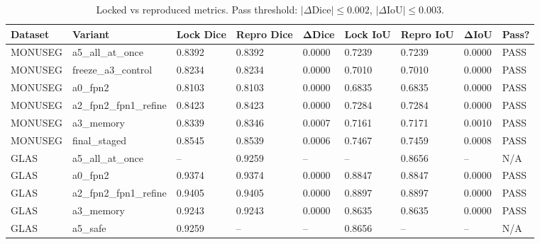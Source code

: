 \begin{table}[htbp]
  \centering
  \small
  \begin{tabular}{lllllllll}
  \toprule
  \textbf{Dataset} & \textbf{Variant} & \textbf{Lock Dice} & \textbf{Repro Dice} & \textbf{ΔDice} & \textbf{Lock IoU} & \textbf{Repro IoU} & \textbf{ΔIoU} & \textbf{Pass?} \\
  \midrule
  MONUSEG & a5_all_at_once & 0.8392 & 0.8392 & 0.0000 & 0.7239 & 0.7239 & 0.0000 & PASS \\
  MONUSEG & freeze_a3_control & 0.8234 & 0.8234 & 0.0000 & 0.7010 & 0.7010 & 0.0000 & PASS \\
  MONUSEG & a0_fpn2 & 0.8103 & 0.8103 & 0.0000 & 0.6835 & 0.6835 & 0.0000 & PASS \\
  MONUSEG & a2_fpn2_fpn1_refine & 0.8423 & 0.8423 & 0.0000 & 0.7284 & 0.7284 & 0.0000 & PASS \\
  MONUSEG & a3_memory & 0.8339 & 0.8346 & 0.0007 & 0.7161 & 0.7171 & 0.0010 & PASS \\
  MONUSEG & final_staged & 0.8545 & 0.8539 & 0.0006 & 0.7467 & 0.7459 & 0.0008 & PASS \\
  GLAS & a5_all_at_once & -- & 0.9259 & -- & -- & 0.8656 & -- & N/A \\
  GLAS & a0_fpn2 & 0.9374 & 0.9374 & 0.0000 & 0.8847 & 0.8847 & 0.0000 & PASS \\
  GLAS & a2_fpn2_fpn1_refine & 0.9405 & 0.9405 & 0.0000 & 0.8897 & 0.8897 & 0.0000 & PASS \\
  GLAS & a3_memory & 0.9243 & 0.9243 & 0.0000 & 0.8635 & 0.8635 & 0.0000 & PASS \\
  GLAS & a5_safe & 0.9259 & -- & -- & 0.8656 & -- & -- & N/A \\
  \bottomrule
  \end{tabular}
  \caption{Locked vs reproduced metrics. Pass threshold: $|\Delta\text{Dice}| \leq 0.002$, $|\Delta\text{IoU}| \leq 0.003$.}
  \label{tab:metric_correction}
\end{table}
